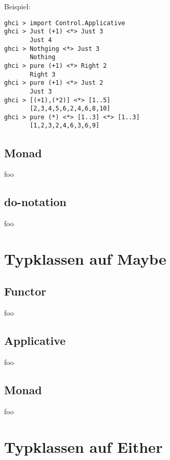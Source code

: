\documentclass{beamer}
\begin{document}
\begin{frame}[fragile]
Beispiel:
\begin{verbatim}
ghci > import Control.Applicative
ghci > Just (+1) <*> Just 3
       Just 4
ghci > Nothging <*> Just 3
       Nothing
ghci > pure (+1) <*> Right 2
       Right 3
ghci > pure (+1) <*> Just 2
       Just 3
ghci > [(+1),(*2)] <*> [1..5]
       [2,3,4,5,6,2,4,6,8,10]
ghci > pure (*) <*> [1..3] <*> [1..3]
       [1,2,3,2,4,6,3,6,9]
\end{verbatim}
\end{frame}

\subsection{Monad}
\begin{frame}
 foo
\end{frame}

\subsection{do-notation}
\begin{frame}
 foo
\end{frame}

\section{Typklassen auf Maybe}
\subsection{Functor}
\begin{frame}
 foo
\end{frame}

\subsection{Applicative}
\begin{frame}
 foo
\end{frame}

\subsection{Monad}
\begin{frame}
 foo
\end{frame}

\section{Typklassen auf Either}
\end{document}
